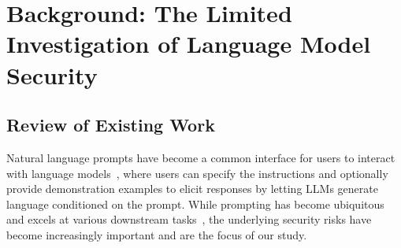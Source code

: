 \section{Background: The Limited Investigation of Language Model Security}
\label{sec:background}




\subsection{Review of Existing Work}

Natural language prompts have become a common interface for users to interact
with language models~\cite{Liu2021PretrainPA}, where users can specify the instructions and optionally provide demonstration examples to elicit responses by letting LLMs generate language conditioned on the prompt. 
While prompting has become ubiquitous and excels at various downstream tasks~\cite{Wei2022ChainOT,Gao2022PALPL,Vilar2022PromptingPF,Madaan2023SelfRefineIR}, the underlying security risks have become increasingly important and are the focus of our study. 

